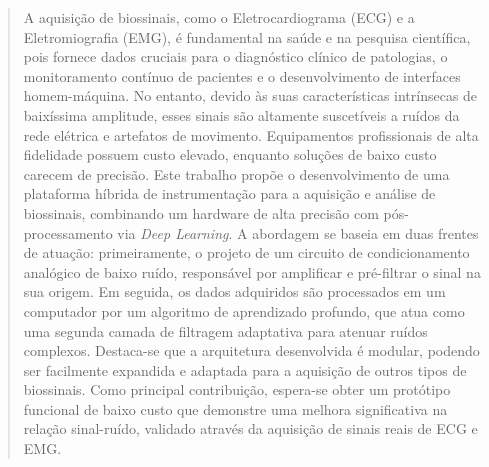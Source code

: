 \documentclass[tcc,capa]{texufpel}
\begin{document}
\begin{abstract}
  A aquisição de biossinais, como o Eletrocardiograma (ECG) e a Eletromiografia (EMG), é fundamental na saúde e na pesquisa científica, pois fornece dados cruciais para o diagnóstico clínico de patologias, o monitoramento contínuo de pacientes e o desenvolvimento de interfaces homem-máquina. No entanto, devido às suas características intrínsecas de baixíssima amplitude, esses sinais são altamente suscetíveis a ruídos da rede elétrica e artefatos de movimento. Equipamentos profissionais de alta fidelidade possuem custo elevado, enquanto soluções de baixo custo carecem de precisão. Este trabalho propõe o desenvolvimento de uma plataforma híbrida de instrumentação para a aquisição e análise de biossinais, combinando um hardware de alta precisão com pós-processamento via \textit{Deep Learning}. A abordagem se baseia em duas frentes de atuação: primeiramente, o projeto de um circuito de condicionamento analógico de baixo ruído, responsável por amplificar e pré-filtrar o sinal na sua origem. Em seguida, os dados adquiridos são processados em um computador por um algoritmo de aprendizado profundo, que atua como uma segunda camada de filtragem adaptativa para atenuar ruídos complexos. Destaca-se que a arquitetura desenvolvida é modular, podendo ser facilmente expandida e adaptada para a aquisição de outros tipos de biossinais. Como principal contribuição, espera-se obter um protótipo funcional de baixo custo que demonstre uma melhora significativa na relação sinal-ruído, validado através da aquisição de sinais reais de ECG e EMG.
\end{abstract}
\end{document}
